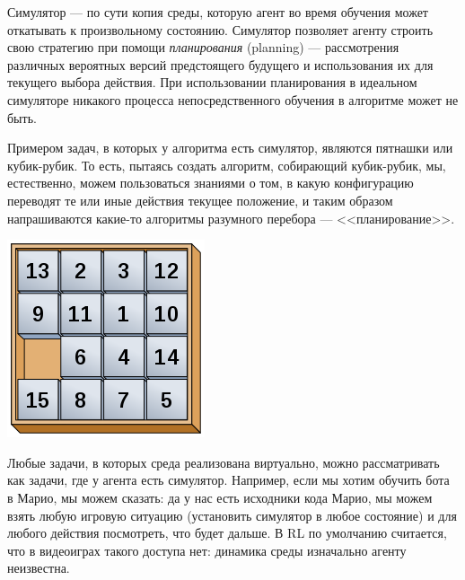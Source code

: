 Симулятор --- по сути копия среды, которую агент во время обучения может откатывать к произвольному состоянию. Симулятор позволяет агенту строить свою стратегию при помощи \emph{планирования} (planning) --- рассмотрения различных вероятных версий предстоящего будущего и использования их для текущего выбора действия. При использовании планирования в идеальном симуляторе никакого процесса непосредственного обучения в алгоритме может не быть.

\begin{exampleBox}[righthand ratio=0.15, sidebyside, sidebyside align=center, lower separated=false]{}
Примером задач, в которых у алгоритма есть симулятор, являются пятнашки или кубик-рубик. То есть, пытаясь создать алгоритм, собирающий кубик-рубик, мы, естественно, можем пользоваться знаниями о том, в какую конфигурацию переводят те или иные действия текущее положение, и таким образом напрашиваются какие-то алгоритмы разумного перебора --- <<планирование>>.

\tcblower
\includegraphics[width=\textwidth]{Images/puzzle.png}
\end{exampleBox}

\begin{example}
Любые задачи, в которых среда реализована виртуально, можно рассматривать как задачи, где у агента есть симулятор. Например, если мы хотим обучить бота в Марио, мы можем сказать: да у нас есть исходники кода Марио, мы можем взять любую игровую ситуацию (установить симулятор в любое состояние) и для любого действия посмотреть, что будет дальше. В RL по умолчанию считается, что в видеоиграх такого доступа нет: динамика среды изначально агенту неизвестна.
\end{example}

